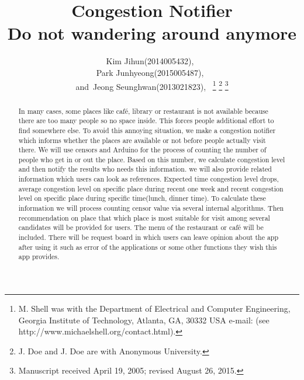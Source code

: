 \documentclass[journal]{IEEEtran}
\begin{document}
\title{ Congestion Notifier\\ Do not wandering around anymore}


\author{ Kim Jihun(2014005432),~\\
        Park Junhyeong(2015005487),~
        \\and~Jeong Seunghwan(2013021823),~%
\thanks{M. Shell was with the Department
of Electrical and Computer Engineering, Georgia Institute of Technology, Atlanta,
GA, 30332 USA e-mail: (see http://www.michaelshell.org/contact.html).}%
\thanks{J. Doe and J. Doe are with Anonymous University.}%
\thanks{Manuscript received April 19, 2005; revised August 26, 2015.}}









\maketitle

\begin{abstract}
In many cases, some places like café, library or restaurant is not available because there are too many people so no space inside. This forces people additional effort to find somewhere else. To avoid this annoying situation, we make a congestion notifier which informs whether the places are available or not before people actually visit there. We will use censors and Arduino for the process of counting the number of people who get in or out the place. Based on this number, we calculate congestion level and then notify the results who needs this information. we will also provide related information which users can look as references. Expected time congestion level drops, average congestion level on specific place during recent one week and recent congestion level on specific place during specific time(lunch, dinner time). To calculate these information we will process counting censor value via several internal algorithms. Then recommendation on place that which place is most suitable for visit among several candidates will be provided for users. The menu of the restaurant or café will be included. There will be request board in which users can leave opinion about the app after using it such as error of the applications or some other functions they wish this app provides.
\end{abstract}
\end{document}
